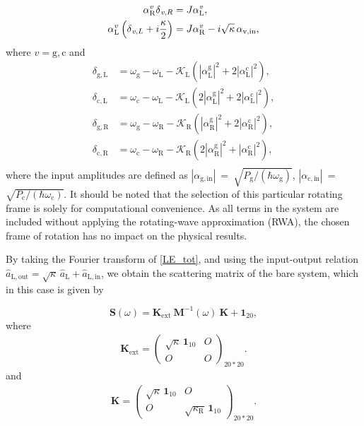\documentclass[%
reprint,
floatfix,
superscriptaddress,
amsmath,amssymb,
aps,
pra,
]{revtex4-2}
\newcommand*{\scrpt}[1]{\mathrm{#1}}
\newcommand*{\s}[1]{\ensuremath{_\scrpt{#1}}}
\begin{document}
%
\begin{subequations}
\label{MF_Bare}
\begin{align}
 \alpha\mathrm{^\textit{v}_R} 
 \delta\s\mathrm{_{\textit{v},R}} 
 & = J \alpha\mathrm{^\textit{v}_L}, \\
 \alpha\mathrm{^\textit{v}_L} \left( \delta\s\mathrm{_{\textit{v},L}} + i \frac{\kappa}{2} \right) & = J \alpha\mathrm{^\textit{v}_R} - i \sqrt{\kappa} \, \alpha\s{v,in},
\end{align}
\label{eq_steady_state_Langevin_alphas}
\end{subequations}
%
where $v = \mathrm{g,c}$ and 
%
\begin{subequations}
\label{MF_Bare_detun}
\begin{align}
\delta\s{g,L} & = \omega\s{g} - \omega\s{L} - \mathcal{K}\s{L} \left(|\alpha\mathrm{^{g}_L}|^2 + 2 |\alpha\mathrm{^{c}_L}|^2 \right), \\
\delta\s{c,L} & = \omega\s{c} - \omega\s{L} - \mathcal{K}\s{L} \left( 2 |\alpha\mathrm{^{g}_L}|^2 + 2 |\alpha\mathrm{^{c}_L}|^2 \right),\\
%
\delta\s{g,R} & = \omega\s{g} - \omega\s{R} - \mathcal{K}\s{R} \left(|\alpha\mathrm{^{g}_R}|^2 + 2 |\alpha\mathrm{^{c}_R}|^2 \right), \\
\delta\s{c,R} & = \omega\s{c} - \omega\s{R} - \mathcal{K}\s{R} \left(2 |\alpha\mathrm{^{g}_R}|^2 + |\alpha\mathrm{^{c}_R}|^2 \right),  \\
%
\end{align}
\end{subequations}
%
where the input amplitudes are defined as $|\alpha\s{g,in}|$~=~$\sqrt{P\s{g}/(\hbar \omega\s{g})}$, $|\alpha\s{c,in}|$~=~$\sqrt{P\s{c}/(\hbar \omega\s{c})}$.
%
It should be noted that the selection of this particular rotating frame is solely for computational convenience. As all terms in the system are included without applying the rotating-wave approximation (RWA), the chosen frame of rotation has no impact on the physical results.
%

By taking the Fourier transform of \cref{LE_tot}, and using the input-output relation $\hat{a}\mathrm{_{L,out}}=\sqrt{\kappa}\,\hat{a}_\mathrm{L}+\hat{a}\mathrm{_{L,in}}$, we obtain the scattering matrix of the bare system, which in this case is given by 

%
\begin{equation}
\label{SM_B}
    \mathbf{S}(\omega) = \mathbf{K}\s{\mathrm{ext}} \: \mathbf{M}^{-1}(\omega) \: \mathbf{K} + \mathbf{1}_{20},
\end{equation}
%
where
%
\begin{align}
\label{Kext}
\mathbf{K}\s{\mathrm{ext}} = \begin{pmatrix}
\sqrt{\kappa} \, \mathbf{1}_{10} & O \\
O & O
\end{pmatrix}_{20 * 20}.
\end{align}
%
and
%
\begin{align}
\label{KB}
\mathbf{K} = \begin{pmatrix}
\sqrt{\kappa} \, \mathbf{1}_{10} & O \\
O & \sqrt{\kappa\s{R}} \, \mathbf{1}_{10}
\end{pmatrix}_{20 * 20}.
\end{align}
%
\end{document}

